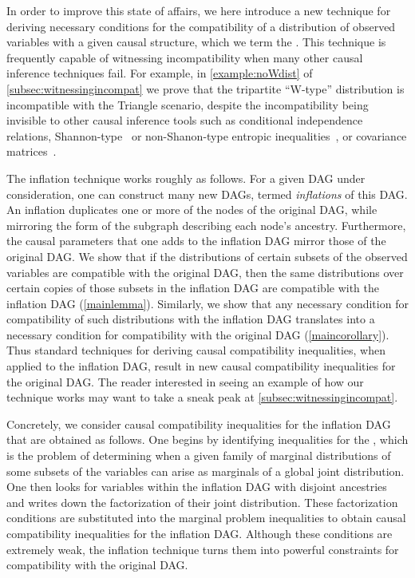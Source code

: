 \documentclass[aps,english,10pt,superscriptaddress,onecolumn,twoside,longbibliography,pra,floatfix,fleqn,nofootinbib]{revtex4-1}%
\newcommand*{\tblue}[1]{{\color{MidnightBlue}{\textbf{#1}}}}
\theoremstyle{definition}
\newcounter{example}[section]
\begin{document}
In order to improve this state of affairs, we here introduce a new technique for deriving necessary conditions for the compatibility of a distribution of observed variables with a given causal structure, which we term the {\em\tblue{inflation technique}}. This technique is frequently capable of witnessing incompatibility when many other causal inference techniques fail. For example, in \cref{example:noWdist} of \cref{subsec:witnessingincompat} we prove that the tripartite ``W-type'' distribution is incompatible with the Triangle scenario, despite the incompatibility being invisible to other causal inference tools such as conditional independence relations, Shannon-type~\cite{fritz2013marginal,chaves2014novel,chaves2014informationinference} or non-Shanon-type entropic inequalities~\cite{weilenmann2016entropic}, or covariance matrices~\cite{kela2016covariance}.

The inflation technique works roughly as follows. For a given DAG under consideration, one can construct many new DAGs, termed {\em inflations} of this DAG. An inflation duplicates one or more of the nodes of the original DAG, while mirroring the form of the subgraph describing each node's ancestry. Furthermore, the causal parameters that one adds to the inflation DAG mirror those of the original DAG.  We show that if the distributions of certain subsets of the observed variables are compatible with the original DAG, then the same distributions over certain copies of those subsets in the inflation DAG are compatible with the inflation DAG (\cref{mainlemma}).  Similarly, we show that any necessary condition for compatibility of such distributions with the inflation DAG translates into a necessary condition for compatibility with the original DAG (\cref{maincorollary}).  Thus standard techniques for deriving causal compatibility inequalities, when applied to the inflation DAG, result in new causal compatibility inequalities for the original DAG. The reader interested in seeing an example of how our technique works may want to take a sneak peak at \cref{subsec:witnessingincompat}.

Concretely, we consider causal compatibility inequalities for the inflation DAG that are obtained as follows.  One begins by identifying inequalities for the \tblue{marginal problem}, which is the problem of determining when a given family of marginal distributions of some subsets of the variables can arise as marginals of a global joint distribution. One then looks for variables within the inflation DAG with disjoint ancestries and writes down the factorization of their joint distribution.  These factorization conditions are substituted into the marginal problem inequalities to obtain causal compatibility inequalities for the inflation DAG. Although these conditions are extremely weak, the inflation technique turns them into powerful constraints for compatibility with the original DAG.
\end{document}
